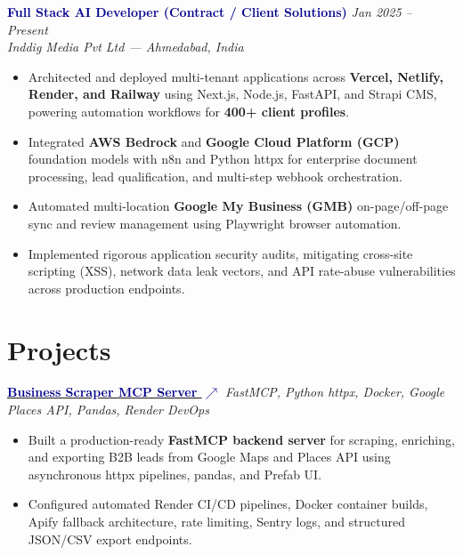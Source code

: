 \documentclass[10.5pt]{article}
\newcommand{\faExternalLink}{$\nearrow$}
\begin{document}
\vspace{2pt}
\noindent\textbf{\textcolor{darkblue}{Full Stack AI Developer (Contract / Client Solutions)}} \hfill \textit{\small\color{medgray}Jan 2025 -- Present}\\
{\small\color{accentblue}\textit{Inddig Media Pvt Ltd --- Ahmedabad, India}}
\begin{itemize}
\item Architected and deployed multi-tenant applications across \textbf{Vercel, Netlify, Render, and Railway} using Next.js, Node.js, FastAPI, and Strapi CMS, powering automation workflows for \textbf{400+ client profiles}.
\item Integrated \textbf{AWS Bedrock} and \textbf{Google Cloud Platform (GCP)} foundation models with n8n and Python httpx for enterprise document processing, lead qualification, and multi-step webhook orchestration.
\item Automated multi-location \textbf{Google My Business (GMB)} on-page/off-page sync and review management using Playwright browser automation.
\item Implemented rigorous application security audits, mitigating cross-site scripting (XSS), network data leak vectors, and API rate-abuse vulnerabilities across production endpoints.
\end{itemize}

\section*{Projects}

\noindent\href{https://scraper-o801.onrender.com/}{\textbf{\textcolor{darkblue}{Business Scraper MCP Server \faExternalLink}}} \hfill \textit{\small\color{medgray}FastMCP, Python httpx, Docker, Google Places API, Pandas, Render DevOps}
\begin{itemize}
\item Built a production-ready \textbf{FastMCP backend server} for scraping, enriching, and exporting B2B leads from Google Maps and Places API using asynchronous httpx pipelines, pandas, and Prefab UI.
\item Configured automated Render CI/CD pipelines, Docker container builds, Apify fallback architecture, rate limiting, Sentry logs, and structured JSON/CSV export endpoints.
\end{itemize}

\vspace{2pt}
\end{document}
